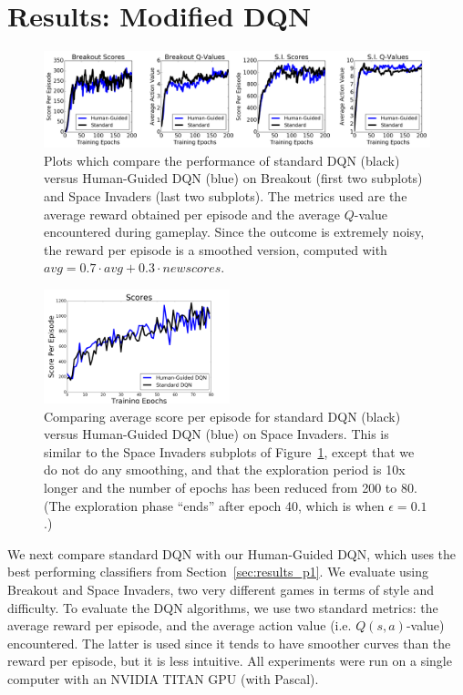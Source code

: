 \documentclass[letterpaper, 10pt, conference]{ieeeconf}
\begin{document}
\section{Results: Modified DQN}\label{sec:results_p2}

\begin{figure}[t]
\centering
\includegraphics[width=1.00\textwidth]{figures/fig_breakout_si_together.png}
\caption{\footnotesize
Plots which compare the performance of standard DQN (black) versus Human-Guided
DQN (blue) on Breakout (first two subplots) and Space Invaders (last two
subplots). The metrics used are the average reward obtained per episode
and the average $Q$-value encountered during gameplay. Since the outcome is
extremely noisy, the reward per episode is a smoothed version, computed with
$avg = 0.7\cdot avg + 0.3\cdot newscores$.
}
\label{fig:human_dqn_performance}
\end{figure}

\begin{figure}[t]
\centering
\includegraphics[width=0.48\textwidth]{figures/fig_space_invaders_longer_exploration.png}
\caption{\footnotesize
Comparing average score per episode for standard DQN (black) versus Human-Guided
DQN (blue) on Space Invaders. This is similar to the Space Invaders subplots of
Figure~\ref{fig:human_dqn_performance}, except that we do not do any smoothing,
and that the exploration period is 10x longer and the number of epochs has been
reduced from 200 to 80.  (The exploration phase ``ends'' after epoch 40, which
is when $\epsilon=0.1$.)
}
\label{fig:sp_inv_longer_exploration}
\end{figure}

We next compare standard DQN with our Human-Guided DQN, which uses the best
performing classifiers from Section~\ref{sec:results_p1}. We evaluate using
Breakout and Space Invaders, two very different games in terms of style and
difficulty.  To evaluate the DQN algorithms, we use two standard metrics: the
average reward per episode, and the average action value (i.e. $Q(s,a)$-value)
encountered. The latter is used since it tends to have smoother curves than the
reward per episode, but it is less intuitive.  All experiments were run on a
single computer with an NVIDIA TITAN GPU (with Pascal).
\end{document}
